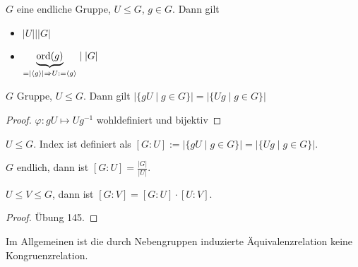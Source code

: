 \begin{theorem}
    $G$ eine endliche Gruppe, $U \le G$, $g \in G$. Dann gilt
    \begin{itemize}[topsep=0cm, label={--}]
        \item $\vert U \vert \mid \vert G \vert$ 
        \item $\underbrace{\operatorname{ord}(g)}_{= \vert \langle g \rangle \vert \Rightarrow U := \langle g \rangle} \mid \vert G \vert $
    \end{itemize}
\end{theorem}

\begin{example}
    
\end{example}

\begin{lemma}
    $G$ Gruppe, $U \le G$. Dann gilt $\vert \{gU \mid g \in G\}\vert = \vert \{Ug \mid g \in G\}\vert$
\end{lemma}
\begin{proof}
    $\varphi: gU \mapsto Ug^{-1}$ wohldefiniert und bijektiv
\end{proof}

\begin{definition}
    $U \le G$. Index ist definiert als $[G:U] := \vert \{gU \mid g \in G\}\vert = \vert \{Ug \mid g \in G\}\vert$. 
\end{definition}

\begin{remark}
    $G$ endlich, dann ist $[G:U] = \frac{\vert G \vert}{\vert U \vert}$.
\end{remark}

\begin{theorem}[Indexsatz]
    $U \le V \le G$, dann ist $[G:V] = [G:U] \cdot [U:V]$. 
\end{theorem}
\begin{proof}
    Übung 145.
\end{proof}

Im Allgemeinen ist die durch Nebengruppen induzierte Äquivalenzrelation keine Kongruenzrelation.

